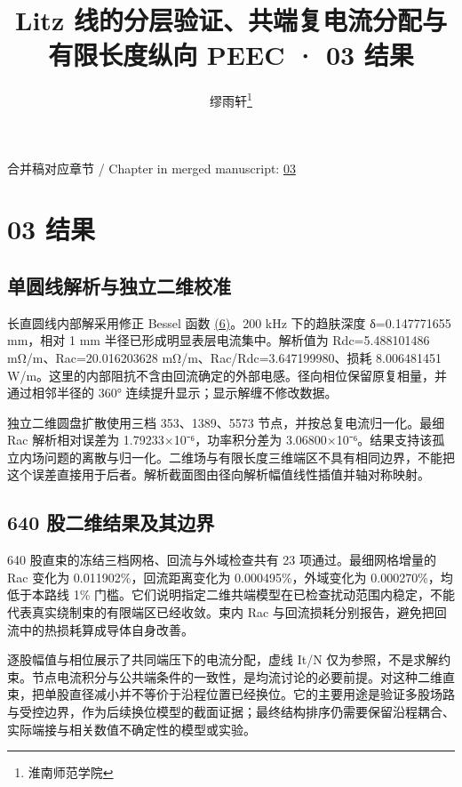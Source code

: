 \documentclass[journal,10pt]{IEEEtran}
\begin{document}
\title{Litz 线的分层验证、共端复电流分配与有限长度纵向 PEEC · 03 结果}
\author{缪雨轩\thanks{淮南师范学院}}

\maketitle
\noindent 合并稿对应章节 / Chapter in merged manuscript: \href{paper_zh-CN_ieee.pdf#chapter-03}{03}\par
\FloatBarrier
\section*{03 结果}
\hypertarget{chapter-03}{}
\subsection*{单圆线解析与独立二维校准}
\hypertarget{03.analytic.heading}{}
长直圆线内部解采用修正 Bessel 函数 \href{paper_zh-CN_ieee.pdf#E03}{(6)}。200 kHz 下的趋肤深度 δ=0.147771655 mm，相对 1 mm 半径已形成明显表层电流集中。解析值为 Rdc=5.488101486 mΩ/m、Rac=20.016203628 mΩ/m、Rac/Rdc=3.647199980、损耗 8.006481451 W/m。这里的内部阻抗不含由回流确定的外部电感。径向相位保留原复相量，并通过相邻半径的 360° 连续提升显示；显示解缠不修改数据。


独立二维圆盘扩散使用三档 353、1389、5573 节点，并按总复电流归一化。最细 Rac 解析相对误差为 1.79233×10⁻⁶，功率积分差为 3.06800×10⁻⁶。结果支持该孤立内场问题的离散与归一化。二维场与有限长度三维端区不具有相同边界，不能把这个误差直接用于后者。解析截面图由径向解析幅值线性插值并轴对称映射。


\subsection*{640 股二维结果及其边界}
\hypertarget{03.coax_results.heading}{}
640 股直束的冻结三档网格、回流与外域检查共有 23 项通过。最细网格增量的 Rac 变化为 0.011902\%，回流距离变化为 0.000495\%，外域变化为 0.000270\%，均低于本路线 1\% 门槛。它们说明指定二维共端模型在已检查扰动范围内稳定，不能代表真实绕制束的有限端区已经收敛。束内 Rac 与回流损耗分别报告，避免把回流中的热损耗算成导体自身改善。


逐股幅值与相位展示了共同端压下的电流分配，虚线 It/N 仅为参照，不是求解约束。节点电流积分与公共端条件的一致性，是均流讨论的必要前提。对这种二维直束，把单股直径减小并不等价于沿程位置已经换位。它的主要用途是验证多股场路与受控边界，作为后续换位模型的截面证据；最终结构排序仍需要保留沿程耦合、实际端接与相关数值不确定性的模型或实验。
\end{document}

